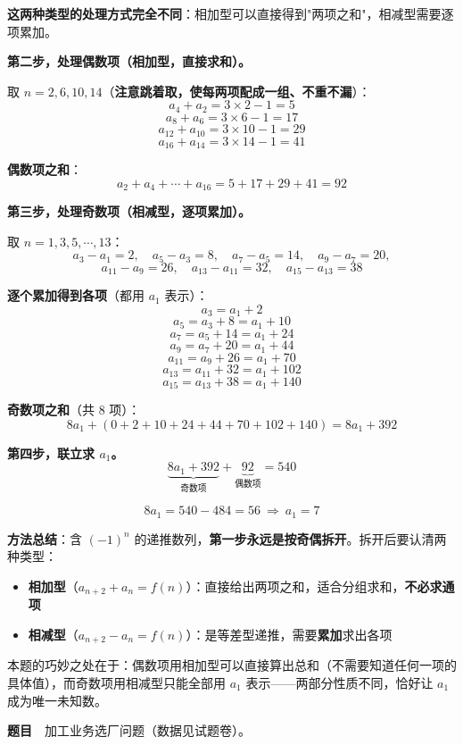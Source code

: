 \textbf{这两种类型的处理方式完全不同}：相加型可以直接得到"两项之和"，相减型需要逐项累加。

\textbf{第二步，处理偶数项（相加型，直接求和）。}

取 $n=2,6,10,14$（\textbf{注意跳着取，使每两项配成一组、不重不漏}）：
\[a_4+a_2=3\times2-1=5\]
\[a_8+a_6=3\times6-1=17\]
\[a_{12}+a_{10}=3\times10-1=29\]
\[a_{16}+a_{14}=3\times14-1=41\]

\textbf{偶数项之和}：
\[a_2+a_4+\cdots+a_{16}=5+17+29+41=92\]

\textbf{第三步，处理奇数项（相减型，逐项累加）。}

取 $n=1,3,5,\cdots,13$：
\[a_3-a_1=2,\quad a_5-a_3=8,\quad a_7-a_5=14,\quad a_9-a_7=20,\]
\[a_{11}-a_9=26,\quad a_{13}-a_{11}=32,\quad a_{15}-a_{13}=38\]

\textbf{逐个累加得到各项}（都用 $a_1$ 表示）：
\[a_3=a_1+2\]
\[a_5=a_3+8=a_1+10\]
\[a_7=a_5+14=a_1+24\]
\[a_9=a_7+20=a_1+44\]
\[a_{11}=a_9+26=a_1+70\]
\[a_{13}=a_{11}+32=a_1+102\]
\[a_{15}=a_{13}+38=a_1+140\]

\textbf{奇数项之和}（共 $8$ 项）：
\[8a_1+(0+2+10+24+44+70+102+140)=8a_1+392\]

\textbf{第四步，联立求 $a_1$。}
\[\underbrace{8a_1+392}_{\text{奇数项}}+\underbrace{92}_{\text{偶数项}}=540\]

\[8a_1=540-484=56\ \Longrightarrow\ a_1=7\]


\begin{gktip}
\textbf{方法总结}：含 $(-1)^{n}$ 的递推数列，\textbf{第一步永远是按奇偶拆开}。拆开后要认清两种类型：
\begin{itemize}
\item \textbf{相加型}（$a_{n+2}+a_n=f(n)$）：直接给出两项之和，适合分组求和，\textbf{不必求通项}
\item \textbf{相减型}（$a_{n+2}-a_n=f(n)$）：是等差型递推，需要\textbf{累加}求出各项
\end{itemize}

本题的巧妙之处在于：偶数项用相加型可以直接算出总和（不需要知道任何一项的具体值），而奇数项用相减型只能全部用 $a_1$ 表示——两部分性质不同，恰好让 $a_1$ 成为唯一未知数。
\end{gktip}

\par\medskip



\textbf{题目}　加工业务选厂问题（数据见试题卷）。

